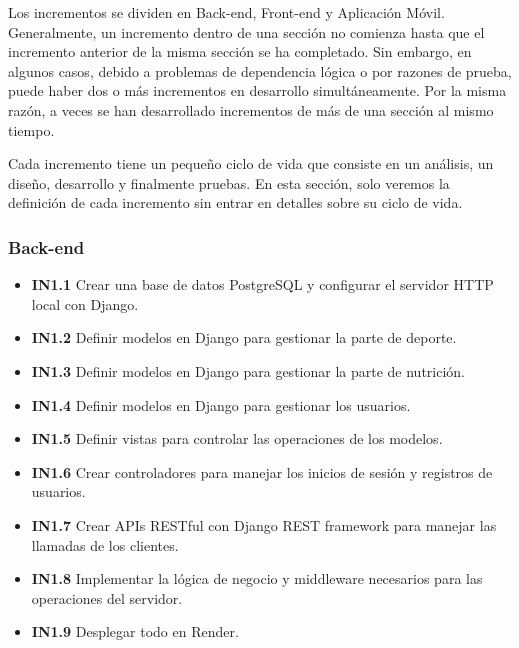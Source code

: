Los incrementos se dividen en Back-end, Front-end y Aplicación Móvil. Generalmente, un incremento dentro de una sección no comienza hasta que el incremento anterior de la misma sección se ha completado. Sin embargo, en algunos casos, debido a problemas de dependencia lógica o por razones de prueba, puede haber dos o más incrementos en desarrollo simultáneamente. Por la misma razón, a veces se han desarrollado incrementos de más de una sección al mismo tiempo.

Cada incremento tiene un pequeño ciclo de vida que consiste en un análisis, un diseño, desarrollo y finalmente pruebas. En esta sección, solo veremos la definición de cada incremento sin entrar en detalles sobre su ciclo de vida.

\subsubsection{Back-end}
\begin{itemize}
    \item \textbf{IN1.1} Crear una base de datos PostgreSQL y configurar el servidor HTTP local con Django.
    \item \textbf{IN1.2} Definir modelos en Django para gestionar la parte de deporte.
    \item \textbf{IN1.3} Definir modelos en Django para gestionar la parte de nutrición.
    \item \textbf{IN1.4} Definir modelos en Django para gestionar los usuarios.
    \item \textbf{IN1.5} Definir vistas para controlar las operaciones de los modelos.
    \item \textbf{IN1.6} Crear controladores para manejar los inicios de sesión y registros de usuarios.
    \item \textbf{IN1.7} Crear APIs RESTful con Django REST framework para manejar las llamadas de los clientes.
    \item \textbf{IN1.8} Implementar la lógica de negocio y middleware necesarios para las operaciones del servidor.
    \item \textbf{IN1.9} Desplegar todo en Render.
\end{itemize}

